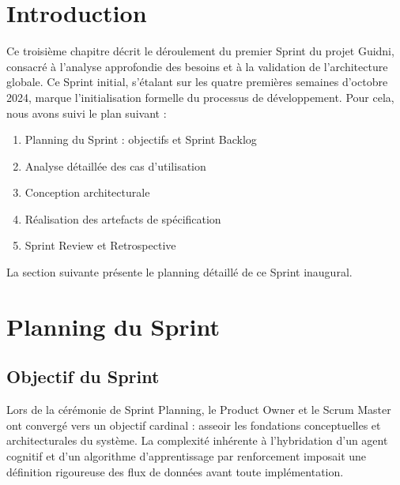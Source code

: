 
\section{Introduction}

Ce troisième chapitre décrit le déroulement du premier Sprint du projet Guidni, consacré à l'analyse approfondie des besoins et à la validation de l'architecture globale. Ce Sprint initial, s'étalant sur les quatre premières semaines d'octobre 2024, marque l'initialisation formelle du processus de développement. Pour cela, nous avons suivi le plan suivant :

\begin{enumerate}
    \item Planning du Sprint : objectifs et Sprint Backlog
    \item Analyse détaillée des cas d'utilisation
    \item Conception architecturale
    \item Réalisation des artefacts de spécification
    \item Sprint Review et Retrospective
\end{enumerate}

La section suivante présente le planning détaillé de ce Sprint inaugural.


\section{Planning du Sprint}

\subsection{Objectif du Sprint}

Lors de la cérémonie de Sprint Planning, le Product Owner et le Scrum Master ont convergé vers un objectif cardinal : asseoir les fondations conceptuelles et architecturales du système. La complexité inhérente à l'hybridation d'un agent cognitif et d'un algorithme d'apprentissage par renforcement imposait une définition rigoureuse des flux de données avant toute implémentation.

